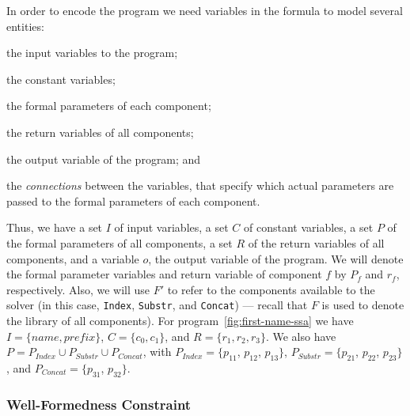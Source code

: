 In order to encode the program we need variables in the formula to model several
entities:
\begin{enumerate*}[(1)]
\item the input variables to the program;
\item the constant variables;
\item the formal parameters of each component;
\item the return variables of all components;
\item the output variable of the program; and
\item the \textit{connections} between the variables, that specify which
  actual parameters are passed to the formal parameters of each component.
\end{enumerate*}
Thus, we have a set $I$ of input variables, a set $C$ of constant variables, a
set $P$ of the formal parameters of all components, a set $R$ of the return
variables of all components, and a variable $o$, the output variable of the
program. We will denote the formal parameter variables and return variable of
component $f$ by $P_f$ and $r_f$, respectively. Also, we will use $F'$ to refer
to the components available to the solver (in this case, \lstinline{Index},
\lstinline{Substr}, and \lstinline{Concat}) --- recall that $F$ is used to
denote the library of all components).
For program~\ref{fig:first-name-ssa} we have $I = \{name, prefix\}$,
$C = \{c_0, c_1\}$, and $R = \{r_1, r_2, r_3\}$. We also have
$P = P_{Index} \cup P_{Substr} \cup P_{Concat}$, with
$P_{Index} = \{p_{11}$, $p_{12}$, $p_{13}\}$,
$P_{Substr} = \{p_{21}$, $p_{22}$, $p_{23}\}$, and
$P_{Concat} = \{p_{31}$, $p_{32}\}$.

\subsubsection{Well-Formedness Constraint}
\label{sec:wfp-constraint}

